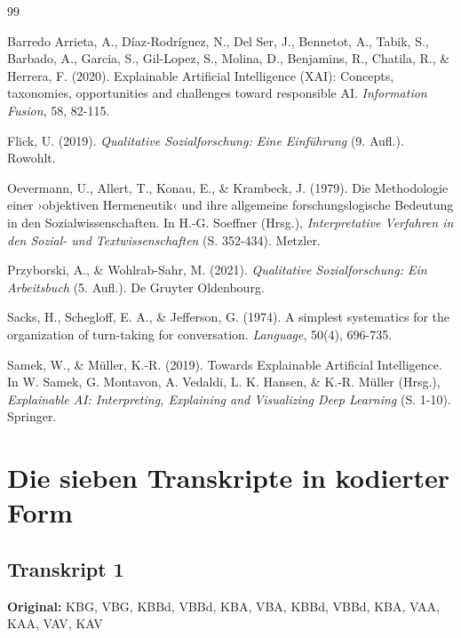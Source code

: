 \documentclass[
  12pt,
  a4paper,
  oneside,
  titlepage
]{article}
\begin{document}
\newpage
\begin{thebibliography}{99}

Barredo Arrieta, A., Díaz-Rodríguez, N., Del Ser, J., Bennetot, A., Tabik, S., 
Barbado, A., Garcia, S., Gil-Lopez, S., Molina, D., Benjamins, R., Chatila, R., 
\& Herrera, F. (2020). Explainable Artificial Intelligence (XAI): Concepts, 
taxonomies, opportunities and challenges toward responsible AI. 
\textit{Information Fusion}, 58, 82-115.

Flick, U. (2019). \textit{Qualitative Sozialforschung: Eine Einführung} (9. Aufl.). 
Rowohlt.

Oevermann, U., Allert, T., Konau, E., \& Krambeck, J. (1979). Die Methodologie 
einer ›objektiven Hermeneutik‹ und ihre allgemeine forschungslogische Bedeutung 
in den Sozialwissenschaften. In H.-G. Soeffner (Hrsg.), \textit{Interpretative 
Verfahren in den Sozial- und Textwissenschaften} (S. 352-434). Metzler.

Przyborski, A., \& Wohlrab-Sahr, M. (2021). \textit{Qualitative Sozialforschung: 
Ein Arbeitsbuch} (5. Aufl.). De Gruyter Oldenbourg.

Sacks, H., Schegloff, E. A., \& Jefferson, G. (1974). A simplest systematics for 
the organization of turn-taking for conversation. \textit{Language}, 50(4), 696-735.

Samek, W., \& Müller, K.-R. (2019). Towards Explainable Artificial Intelligence. 
In W. Samek, G. Montavon, A. Vedaldi, L. K. Hansen, \& K.-R. Müller (Hrsg.), 
\textit{Explainable AI: Interpreting, Explaining and Visualizing Deep Learning} 
(S. 1-10). Springer.

\end{thebibliography}

\newpage
\appendix
\section{Die sieben Transkripte in kodierter Form}

\subsection{Transkript 1}
\textbf{Original:} KBG, VBG, KBBd, VBBd, KBA, VBA, KBBd, VBBd, KBA, VAA, KAA, VAV, KAV
\end{document}
